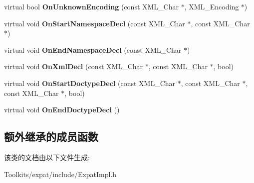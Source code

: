 \begin{DoxyCompactItemize}
\item 
\hypertarget{class_c_expat_aff8075d89c6b836e44d4e55310487cfa}{virtual bool {\bfseries On\+Unknown\+Encoding} (const X\+M\+L\+\_\+\+Char $\ast$, X\+M\+L\+\_\+\+Encoding $\ast$)}\label{class_c_expat_aff8075d89c6b836e44d4e55310487cfa}

\item 
\hypertarget{class_c_expat_a66754f68d5383c154756309ec63dcf49}{virtual void {\bfseries On\+Start\+Namespace\+Decl} (const X\+M\+L\+\_\+\+Char $\ast$, const X\+M\+L\+\_\+\+Char $\ast$)}\label{class_c_expat_a66754f68d5383c154756309ec63dcf49}

\item 
\hypertarget{class_c_expat_a1af1e2bf31374418c1b39281d209389f}{virtual void {\bfseries On\+End\+Namespace\+Decl} (const X\+M\+L\+\_\+\+Char $\ast$)}\label{class_c_expat_a1af1e2bf31374418c1b39281d209389f}

\item 
\hypertarget{class_c_expat_a88803ebebdca695b7665ad288bfca3a3}{virtual void {\bfseries On\+Xml\+Decl} (const X\+M\+L\+\_\+\+Char $\ast$, const X\+M\+L\+\_\+\+Char $\ast$, bool)}\label{class_c_expat_a88803ebebdca695b7665ad288bfca3a3}

\item 
\hypertarget{class_c_expat_a44ff53ce7d170d0cc4bc836363a4651f}{virtual void {\bfseries On\+Start\+Doctype\+Decl} (const X\+M\+L\+\_\+\+Char $\ast$, const X\+M\+L\+\_\+\+Char $\ast$, const X\+M\+L\+\_\+\+Char $\ast$, bool)}\label{class_c_expat_a44ff53ce7d170d0cc4bc836363a4651f}

\item 
\hypertarget{class_c_expat_abcb042b5d2b4ad02e3e1b28075315734}{virtual void {\bfseries On\+End\+Doctype\+Decl} ()}\label{class_c_expat_abcb042b5d2b4ad02e3e1b28075315734}

\end{DoxyCompactItemize}
\subsection*{额外继承的成员函数}


该类的文档由以下文件生成\+:\begin{DoxyCompactItemize}
\item 
Toolkits/expat/include/Expat\+Impl.\+h\end{DoxyCompactItemize}
